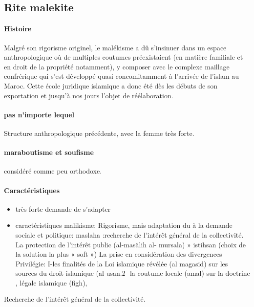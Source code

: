 \subsection{Rite malekite}

\paragraph{Histoire}

 Malgré son rigorisme originel, le malékisme a dû s'insinuer dans un espace anthropologique où de multiples coutumes préexistaient (en matière familiale et en droit de la propriété notamment), y composer avec le complexe maillage confrérique qui s'est développé quasi concomitamment à l'arrivée de l'islam au Maroc.
  Cette école juridique islamique a donc été dès les débuts de son exportation et jusqu'à nos jours l'objet de réélaboration.



\paragraph{pas n'importe lequel}
Structure anthropologique précédente, avec la femme très forte.

\paragraph{maraboutisme et soufisme} considéré comme peu orthodoxe. 


\paragraph{Caractéristiques}

\begin{itemize}
    \item très forte demande de s'adapter
    \item caractéristiques
  malikisme: Rigorisme, mais adaptation du à la demande sociale et politique:
  maslaha :recherche de l'intérêt général de la collectivité.
  La protection de l'intérêt public (al-masälih al-
mursala)
» istihsan (choix de la solution la plus « soft »)   La prise en considération des divergences
  Privilégie: I-les finalités de la Loi islamique révélée (al magasid) 
  sur les sources du droit islamique (al usan.2- la coutume locale 
  (amal) sur la doctrine , légale islamique (figh),
\end{itemize}

\begin{Def}
    Recherche de l'intérêt général de la collectivité.
\end{Def}

